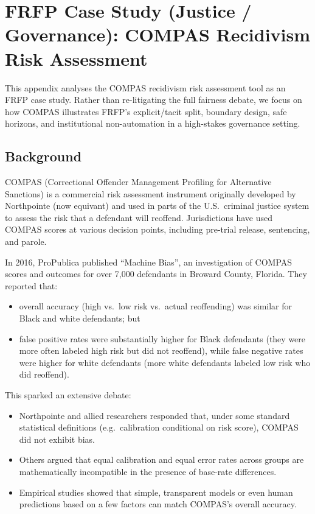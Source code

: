 
\section{FRFP Case Study (Justice / Governance): COMPAS Recidivism Risk Assessment}
\label{app:frfp-compas}

This appendix analyses the COMPAS recidivism risk assessment tool as an
FRFP case study.
Rather than re-litigating the full fairness debate, we focus on how COMPAS
illustrates FRFP’s explicit/tacit split, boundary design, safe horizons,
and institutional non-automation in a high-stakes governance setting.

\subsection{Background}

COMPAS (Correctional Offender Management Profiling for Alternative
Sanctions) is a commercial risk assessment instrument originally developed
by Northpointe (now equivant) and used in parts of the U.S.\ criminal justice
system to assess the risk that a defendant will reoffend.
Jurisdictions have used COMPAS scores at various decision points, including
pre-trial release, sentencing, and parole.

In 2016, ProPublica published ``Machine Bias'', an investigation of COMPAS
scores and outcomes for over 7{,}000 defendants in Broward County, Florida.
They reported that:

\begin{itemize}
  \item overall accuracy (high vs.\ low risk vs.\ actual reoffending) was
        similar for Black and white defendants; but
  \item false positive rates were substantially higher for Black defendants
        (they were more often labeled high risk but did not reoffend), while
        false negative rates were higher for white defendants (more white
        defendants labeled low risk who did reoffend).
\end{itemize}

This sparked an extensive debate:

\begin{itemize}
  \item Northpointe and allied researchers responded that, under some
        standard statistical definitions (e.g.\ calibration conditional on
        risk score), COMPAS did not exhibit bias.
  \item Others argued that equal calibration and equal error rates across
        groups are mathematically incompatible in the presence of base-rate
        differences.
  \item Empirical studies showed that simple, transparent models or even
        human predictions based on a few factors can match COMPAS’s overall
        accuracy.
\end{itemize}

